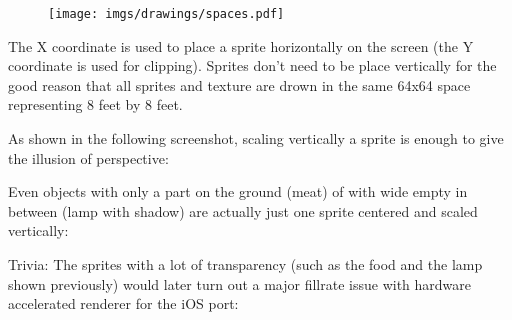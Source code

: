\par
\begin{figure}[H]
\centering
 \texttt{[image: imgs/drawings/spaces.pdf]}
 \end{figure}
\par
The X coordinate is used to place a sprite horizontally on the screen (the Y coordinate is used for clipping). Sprites don't need to be place vertically for the good reason that all sprites and texture are drown in the same 64x64 space representing 8 feet by 8 feet.\\
\par
  \begin{minipage}{.5\textwidth}
  \end{minipage}
   \begin{minipage}{.5\textwidth} 
   \end{minipage}

\par



 As shown in the following screenshot, scaling vertically a sprite is enough to give the illusion of perspective:\\
\par
\begin{figure}[H]
 \centering
\end{figure}

Even objects with only a part on the ground (meat) of with wide empty in between (lamp with shadow) are actually just one sprite centered and scaled vertically:\\



  \begin{minipage}{.5\textwidth} 
   \end{minipage}
  \begin{minipage}{.5\textwidth} 
   \end{minipage}

\par

Trivia: The sprites with a lot of transparency (such as the food and the lamp shown previously) would later turn out a major fillrate issue with hardware accelerated renderer for the iOS port:

